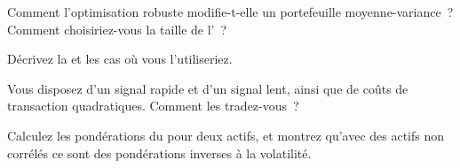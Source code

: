 \begin{interviewq}\label{iq:rs:portfolio-construction-ii:3}
Comment l'optimisation robuste modifie-t-elle un portefeuille moyenne-variance~? Comment choisiriez-vous la taille de l'~?
\end{interviewq}

\begin{interviewq}\label{iq:rs:portfolio-construction-ii:4}
Décrivez la  et les cas où vous l'utiliseriez.
\end{interviewq}

\begin{interviewq}\label{iq:rs:portfolio-construction-ii:5}
Vous disposez d'un signal rapide et d'un signal lent, ainsi que de coûts de transaction quadratiques. Comment les tradez-vous~?
\end{interviewq}

\begin{interviewq}\label{iq:rs:portfolio-construction-ii:6}
Calculez les pondérations du  pour deux actifs, et montrez qu'avec des actifs non corrélés ce sont des pondérations inverses à la volatilité.
\end{interviewq}
